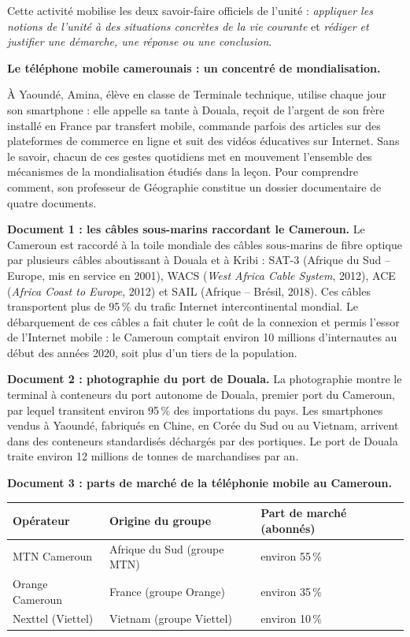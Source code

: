 \documentclass[11pt]{article}
\newcounter{popsec}
\newcounter{popsub}
\newcommand{\courssub}[1]{%
  \stepcounter{popsub}%
  \par\vspace{9pt}\noindent{\popxbold\fontsize{11.5}{13}\selectfont\color{popink}{\color{poporange}\thepopsec.\thepopsub}\hspace{6pt}#1}\par\nopagebreak\vspace{4pt}
}
\begin{document}
Cette activité mobilise les deux savoir-faire officiels de l'unité : \emph{appliquer les notions de l'unité à des situations concrètes de la vie courante} et \emph{rédiger et justifier une démarche, une réponse ou une conclusion}.

\courssub{Situation}

\textbf{Le téléphone mobile camerounais : un concentré de mondialisation.}

À Yaoundé, Amina, élève en classe de Terminale technique, utilise chaque jour son smartphone : elle appelle sa tante à Douala, reçoit de l'argent de son frère installé en France par transfert mobile, commande parfois des articles sur des plateformes de commerce en ligne et suit des vidéos éducatives sur Internet. Sans le savoir, chacun de ces gestes quotidiens met en mouvement l'ensemble des mécanismes de la mondialisation étudiés dans la leçon. Pour comprendre comment, son professeur de Géographie constitue un dossier documentaire de quatre documents.

\textbf{Document 1 : les câbles sous-marins raccordant le Cameroun.} Le Cameroun est raccordé à la toile mondiale des câbles sous-marins de fibre optique par plusieurs câbles aboutissant à Douala et à Kribi : SAT-3 (Afrique du Sud -- Europe, mis en service en 2001), WACS (\emph{West Africa Cable System}, 2012), ACE (\emph{Africa Coast to Europe}, 2012) et SAIL (Afrique -- Brésil, 2018). Ces câbles transportent plus de 95\,\% du trafic Internet intercontinental mondial. Le débarquement de ces câbles a fait chuter le coût de la connexion et permis l'essor de l'Internet mobile : le Cameroun comptait environ 10 millions d'internautes au début des années 2020, soit plus d'un tiers de la population.

\textbf{Document 2 : photographie du port de Douala.} La photographie montre le terminal à conteneurs du port autonome de Douala, premier port du Cameroun, par lequel transitent environ 95\,\% des importations du pays. Les smartphones vendus à Yaoundé, fabriqués en Chine, en Corée du Sud ou au Vietnam, arrivent dans des conteneurs standardisés déchargés par des portiques. Le port de Douala traite environ 12 millions de tonnes de marchandises par an.

\textbf{Document 3 : parts de marché de la téléphonie mobile au Cameroun.}

\begin{center}
\begin{tabularx}{\linewidth}{|l|X|X|}\hline
\rowcolor{popblueL} \textbf{Opérateur} & \textbf{Origine du groupe} & \textbf{Part de marché (abonnés)} \\ \hline
MTN Cameroun & Afrique du Sud (groupe MTN) & environ 55\,\% \\ \hline
Orange Cameroun & France (groupe Orange) & environ 35\,\% \\ \hline
Nexttel (Viettel) & Vietnam (groupe Viettel) & environ 10\,\% \\ \hline
\end{tabularx}
\end{center}
\end{document}
